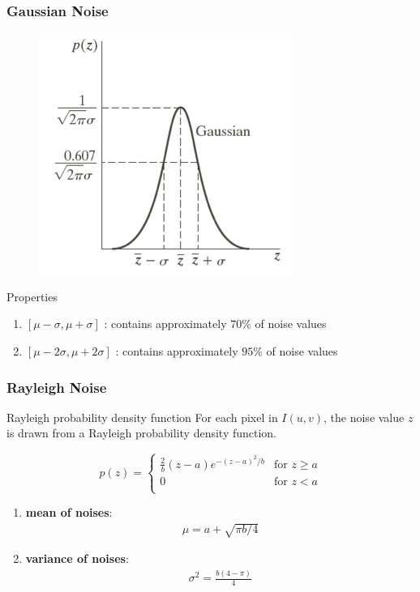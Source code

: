 \documentclass[english,11pt,table,handout]{beamer}
\begin{document}
\frame
{
	\frametitle{Gaussian Noise}
	\begin{figure}[!h]
		\includegraphics[scale=1.0]{gaussian_1d.png}
	\end{figure}
	
	\begin{alertblock}{Properties}
		\begin{enumerate}
			\item $[\mu - \sigma, \mu + \sigma]$ : contains approximately $70\%$ of noise values
			\item $[\mu - 2\sigma, \mu + 2\sigma]$ : contains approximately $95\%$ of noise values
		\end{enumerate}
	\end{alertblock}
}
\frame
{
	\frametitle{Rayleigh Noise}
	\begin{block}{Rayleigh probability density function}
		For each pixel in $I(u,v)$, the noise value $z$ is drawn from a Rayleigh probability density function.
		
		$$
			p(z) =
				\begin{cases}
					\frac{2}{b}(z-a)e^{-(z-a)^{2}/b} & \text{for } z \ge a\\
					0 & \text{for } z < a\\
				\end{cases}
		$$
	
		\begin{enumerate}
			\item \alert{\textbf{mean of noises}}: 
				\begin{align}
					\nonumber
					\mu = a + \sqrt{\pi b/4}
				\end{align}
			\item \alert{\textbf{variance of noises}}:
				\begin{align}
				\nonumber
					\sigma^2 = \frac{b(4-\pi)}{4}
				\end{align}
		\end{enumerate}
		
	\end{block}
	
}
\end{document}
